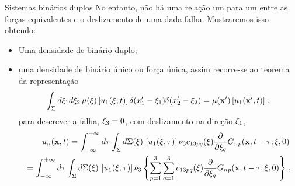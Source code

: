 \documentclass{beamer}
\newcommand{\xvec}{\mathbf{x}}
\newcommand{\xivec}{\boldmath \xi}
\begin{document}
\begin{frame}{Sistemas binários duplos}
		\justifying
No entanto, não há uma relação um para um entre as forças equivalentes e o deslizamento de
uma dada falha. Mostraremos isso  obtendo:
\begin{itemize}
	\item Uma densidade de bin\'ario duplo;
	\item uma densidade de bin\'ario \'unico ou for\c{c}a \'unica, assim recorre-se ao teorema da representa\c{c}\~ao
	\begin{eqnarray*}
		\label{feq11}
		\int_{\Sigma}d\xivec_{1}d\xivec_{2} \, \mu(\xivec)\left[u_{1}(\xivec,t) \right] \delta(x'_1 - \xivec_{1}) \delta(x'_2 - \xivec_{2}) =  \mu(\xvec')\left[u_{1}(\xvec',t) \right] \, , \nonumber
	\end{eqnarray*}
para descrever a falha, $\xivec_3=0$, com deslizamento na dire\c{c}\~ao $\xivec_1$, 
\small{\begin{eqnarray*}
	u_{n}(\xvec,t) = \int_{-\infty }^{+\infty}d\tau\int_{\Sigma}d\Sigma(\xivec) 
	\, \left[ u_{1}(\xivec,\tau)\right] \nu_{3}c_{13pq}(\xivec) \frac{\partial}{\partial \xi_q} G_{np}(\xvec,t-\tau;\xivec,0) \,& \nonumber \\
	 =    \int_{-\infty }^{+\infty}d\tau\int_{\Sigma}d\Sigma(\xivec)  
	\, \left[ u_{1}(\xivec,\tau)\right] \nu_{3} \left\{ \sum_{p=1}^{3} \sum_{q=1}^{3}  c_{13pq}(\xivec) \frac{\partial}{\partial \xi_q} G_{np}(\xvec,t-\tau;\xivec,0) \right\}  \, , &
\end{eqnarray*}}
\end{itemize}
\end{frame}
\end{document}
